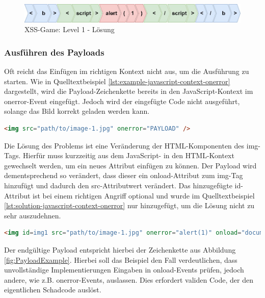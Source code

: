 		\begin{figure}[htbp] 
			\centering
			\includegraphics[width=\textwidth]{contents/images/XSSGameSolution}
			\caption{XSS-Game: Level 1 - Lösung}
			\label{fig:XSSGameSolution}
		\end{figure}

\FloatBarrier
\subsubsection{Ausführen des Payloads}
		
		Oft reicht das Einfügen im richtigen Kontext nicht aus, um die Ausführung zu starten. Wie in Quelltextbeispiel \ref{lst:example-javascript-context-onerror} dargestellt, wird die Payload-Zeichenkette bereits in den JavaScript-Kontext im onerror-Event eingefügt. Jedoch wird der eingefügte Code nicht ausgeführt, solange das Bild korrekt geladen werden kann.
		
\begin{lstlisting}[language=HTML,caption={XSS-Angriffe: ohne Kontextwechsel},label=lst:example-javascript-context-onerror]
<img src="path/to/image-1.jpg" onerror="PAYLOAD" />
\end{lstlisting}
		
		Die Lösung des Problems ist eine Veränderung der HTML-Komponenten des img-Tags. Hierfür muss kurzzeitig aus dem JavaScript- in den HTML-Kontext gewechselt werden, um ein neues Attribut einfügen zu können. Der Payload wird dementsprechend so verändert, dass dieser ein onload-Attribut zum img-Tag hinzufügt und dadurch den src-Attributwert verändert. Das hinzugefügte id-Attribut ist bei einem richtigen Angriff optional und wurde im Quelltextbeispiel \ref{lst:solution-javascript-context-onerror} nur hinzugefügt, um die Lösung nicht zu sehr auszudehnen.
	
\newpage	
\begin{lstlisting}[language=HTML,caption={XSS-Angriffe: mit Kontextwechsel},label=lst:solution-javascript-context-onerror]
<img id=img1 src="path/to/image-1.jpg" onerror="alert(1)" onload="document.getElementById('img1').src=0;" />
\end{lstlisting}
		
		Der endgültige Payload entspricht hierbei der Zeichenkette aus Abbildung \ref{fig:PayloadExample}. Hierbei soll das Beispiel den Fall verdeutlichen, dass unvollständige Implementierungen Eingaben in onload-Events prüfen, jedoch andere, wie z.B. onerror-Events, auslassen. Dies erfordert validen Code, der den eigentlichen Schadcode auslöst.
		
